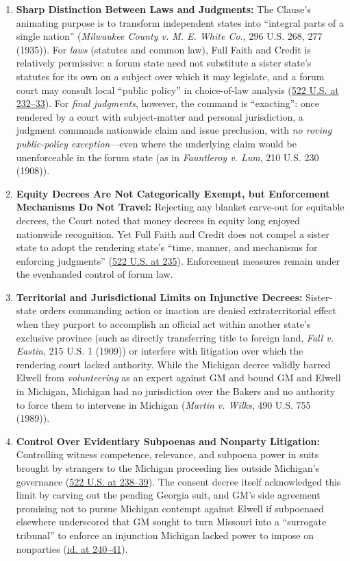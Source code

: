 \documentclass[12pt]{article}
\begin{document}
\begin{enumerate}
  \item \textbf{Sharp Distinction Between Laws and Judgments:} The Clause's animating purpose is to transform independent states into ``integral parts of a single nation'' (\textit{Milwaukee County v. M. E. White Co.}, 296 U.S. 268, 277 (1935)). For \textit{laws} (statutes and common law), Full Faith and Credit is relatively permissive: a forum state need not substitute a sister state's statutes for its own on a subject over which it may legislate, and a forum court may consult local ``public policy'' in choice-of-law analysis (\href{https://www.law.cornell.edu/supremecourt/text/96-653}{522 U.S. at 232--33}). For \textit{final judgments}, however, the command is ``exacting'': once rendered by a court with subject-matter and personal jurisdiction, a judgment commands nationwide claim and issue preclusion, with \textit{no roving public-policy exception}---even where the underlying claim would be unenforceable in the forum state (as in \textit{Fauntleroy v. Lum}, 210 U.S. 230 (1908)).
  \item \textbf{Equity Decrees Are Not Categorically Exempt, but Enforcement Mechanisms Do Not Travel:} Rejecting any blanket carve-out for equitable decrees, the Court noted that money decrees in equity long enjoyed nationwide recognition. Yet Full Faith and Credit does not compel a sister state to adopt the rendering state's ``time, manner, and mechanisms for enforcing judgments'' (\href{https://www.law.cornell.edu/supremecourt/text/96-653}{522 U.S. at 235}). Enforcement measures remain under the evenhanded control of forum law.
  \item \textbf{Territorial and Jurisdictional Limits on Injunctive Decrees:} Sister-state orders commanding action or inaction are denied extraterritorial effect when they purport to accomplish an official act within another state's exclusive province (such as directly transferring title to foreign land, \textit{Fall v. Eastin}, 215 U.S. 1 (1909)) or interfere with litigation over which the rendering court lacked authority. While the Michigan decree validly barred Elwell from \textit{volunteering} as an expert against GM and bound GM and Elwell in Michigan, Michigan had no jurisdiction over the Bakers and no authority to force them to intervene in Michigan (\textit{Martin v. Wilks}, 490 U.S. 755 (1989)).
  \item \textbf{Control Over Evidentiary Subpoenas and Nonparty Litigation:} Controlling witness competence, relevance, and subpoena power in suits brought by strangers to the Michigan proceeding lies outside Michigan's governance (\href{https://supreme.justia.com/cases/federal/us/522/222/}{522 U.S. at 238--39}). The consent decree itself acknowledged this limit by carving out the pending Georgia suit, and GM's side agreement promising not to pursue Michigan contempt against Elwell if subpoenaed elsewhere underscored that GM sought to turn Missouri into a ``surrogate tribunal'' to enforce an injunction Michigan lacked power to impose on nonparties (\href{https://www.law.cornell.edu/supct/html/96-653.ZO.html}{id. at 240--41}).
\end{enumerate}
\end{document}
